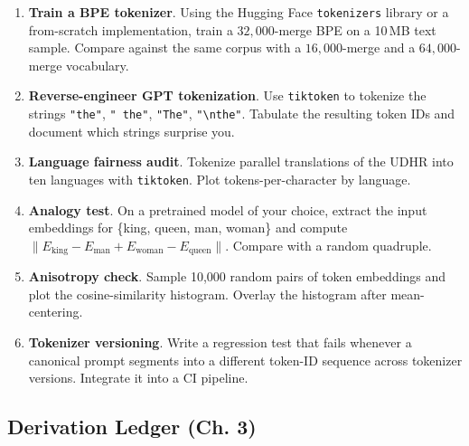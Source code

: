 \begin{enumerate}
  \item \textbf{Train a BPE tokenizer}. Using the Hugging Face
        \texttt{tokenizers} library or a from-scratch implementation,
        train a $32{,}000$-merge BPE on a 10\,MB text sample. Compare
        against the same corpus with a $16{,}000$-merge and a
        $64{,}000$-merge vocabulary.
  \item \textbf{Reverse-engineer GPT tokenization}. Use
        \texttt{tiktoken} to tokenize the strings \texttt{"the"},
        \texttt{" the"}, \texttt{"The"}, \texttt{"\textbackslash nthe"}.
        Tabulate the resulting token IDs and document which strings
        surprise you.
  \item \textbf{Language fairness audit}. Tokenize parallel
        translations of the UDHR into ten languages with
        \texttt{tiktoken}. Plot tokens-per-character by language.
  \item \textbf{Analogy test}. On a pretrained model of your choice,
        extract the input embeddings for \{king, queen, man, woman\}
        and compute $\|E_{\text{king}} - E_{\text{man}} +
        E_{\text{woman}} - E_{\text{queen}}\|$. Compare with a random
        quadruple.
  \item \textbf{Anisotropy check}. Sample 10{,}000 random pairs of
        token embeddings and plot the cosine-similarity histogram.
        Overlay the histogram after mean-centering.
  \item \textbf{Tokenizer versioning}. Write a regression test that
        fails whenever a canonical prompt segments into a different
        token-ID sequence across tokenizer versions. Integrate it
        into a CI pipeline.
\end{enumerate}

\subsection*{Derivation Ledger (Ch. 3)}

